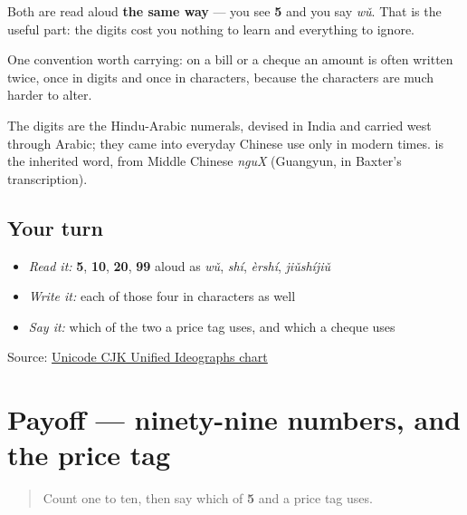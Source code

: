 Both are read aloud \textbf{the same way} — you see \textbf{5} and you say \emph{wǔ}. That is the useful part: the digits cost you nothing to learn and everything to ignore.

One convention worth carrying: on a bill or a cheque an amount is often written twice, once in digits and once in characters, because the characters are much harder to alter.

\begin{cousinweb}
The digits are the Hindu-Arabic numerals, devised in India and carried west through Arabic; they came into everyday Chinese use only in modern times. \textbf{} is the inherited word, from Middle Chinese \emph{nguX} (Guangyun, in Baxter's transcription).
\end{cousinweb}

\subsection*{Your turn}
\begin{itemize}
\raggedright
  \item \emph{Read it:} \textbf{5}, \textbf{10}, \textbf{20}, \textbf{99} aloud as \emph{wǔ}, \emph{shí}, \emph{èrshí}, \emph{jiǔshíjiǔ}
  \item \emph{Write it:} each of those four in characters as well
  \item \emph{Say it:} which of the two a price tag uses, and which a cheque uses
\end{itemize}

\begin{tcolorbox}[breakable,colback=teal!4,colframe=teal!35!black,title={Before you move on}]
Source: \href{https://www.unicode.org/charts/PDF/U4E00.pdf}{Unicode CJK Unified Ideographs chart}
\end{tcolorbox}
\section[Practice]{Payoff — ninety-nine numbers, and the price tag}

\label{lesson:ZH-C21-practice}



\begin{quote}
Count one to ten, then say which of \textbf{5} and \textbf{} a price tag uses.
\end{quote}

